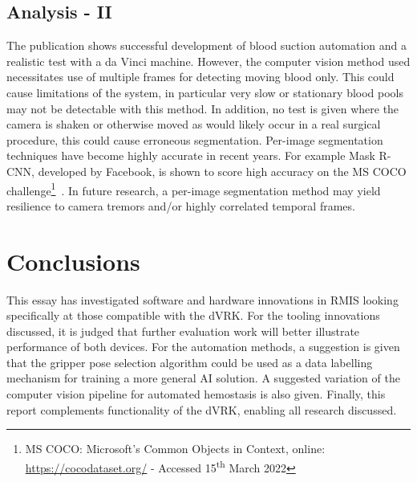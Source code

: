 \documentclass[english]{sobraep}
\begin{document}
\subsection{Analysis - II}
The publication shows successful development of blood suction automation and a realistic test with a da Vinci machine. However, the computer vision method used necessitates use of multiple frames for detecting moving blood only. This could cause limitations of the system, in particular very slow or stationary blood pools may not be detectable with this method. In addition, no test is given where the camera is shaken or otherwise moved as would likely occur in a real surgical procedure, this could cause erroneous segmentation. Per-image segmentation techniques have become highly accurate in recent years. For example Mask R-CNN, developed by Facebook, is shown to score high accuracy on the MS COCO challenge\footnote{MS COCO: Microsoft's Common Objects in Context, online: \url{https://cocodataset.org/} - Accessed 15\textsuperscript{th} March 2022}~\cite{mask-rcnn}. In future research, a per-image segmentation method may yield resilience to camera tremors and/or highly correlated temporal frames. 


\section{Conclusions}
This essay has investigated software and hardware innovations in RMIS looking specifically at those compatible with the dVRK. For the tooling innovations discussed, it is judged that further evaluation work will better illustrate performance of both devices. For the automation methods, a suggestion is given that the gripper pose selection algorithm could be used as a data labelling mechanism for training a more general AI solution. A suggested variation of the computer vision pipeline for automated hemostasis is also given. Finally, this report complements functionality of the dVRK, enabling all research discussed.
\printbibliography
\end{document}
